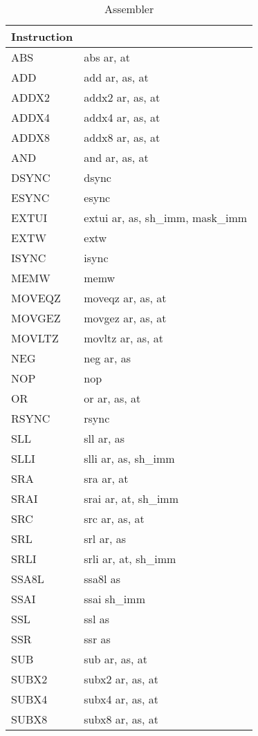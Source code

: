 	\begin{longtable}{|p{5cm}|p{5cm}|}
		\caption{Assembler\label{long}}\\
		\hline
		Instruction & \\
		\hline
        \endhead
		ABS & abs ar, at\\ \hline
		ADD & add ar, as, at\\ \hline
		ADDX2 & addx2 ar, as, at\\ \hline
		ADDX4 & addx4 ar, as, at\\ \hline
		ADDX8 & addx8 ar, as, at\\ \hline
		AND & and ar, as, at\\ \hline
		DSYNC & dsync\\ \hline
		ESYNC & esync\\ \hline
		EXTUI & extui ar, as, sh\_imm, mask\_imm\\ \hline
		EXTW & extw\\ \hline
		ISYNC & isync\\ \hline
		MEMW & memw\\ \hline
		MOVEQZ & moveqz ar, as, at\\ \hline
		MOVGEZ & movgez ar, as, at\\ \hline
		MOVLTZ & movltz ar, as, at\\ \hline
		NEG & neg ar, as\\ \hline
		NOP & nop\\ \hline
		OR & or ar, as, at\\ \hline
		RSYNC & rsync\\ \hline
		SLL & sll ar, as\\ \hline
		SLLI & slli ar, as, sh\_imm\\ \hline
		SRA & sra ar, at\\ \hline
		SRAI & srai ar, at, sh\_imm\\ \hline
		SRC & src ar, as, at\\ \hline
		SRL & srl ar, as\\ \hline
		SRLI & srli ar, at, sh\_imm\\ \hline
		SSA8L & ssa8l as\\ \hline
		SSAI & ssai sh\_imm\\ \hline
		SSL & ssl as\\ \hline
		SSR & ssr as\\ \hline
		SUB & sub ar, as, at\\ \hline
        SUBX2 & subx2 ar, as, at\\ \hline
        SUBX4 & subx4 ar, as, at\\ \hline
        SUBX8 & subx8 ar, as, at\\ \hline
	\end{longtable}
